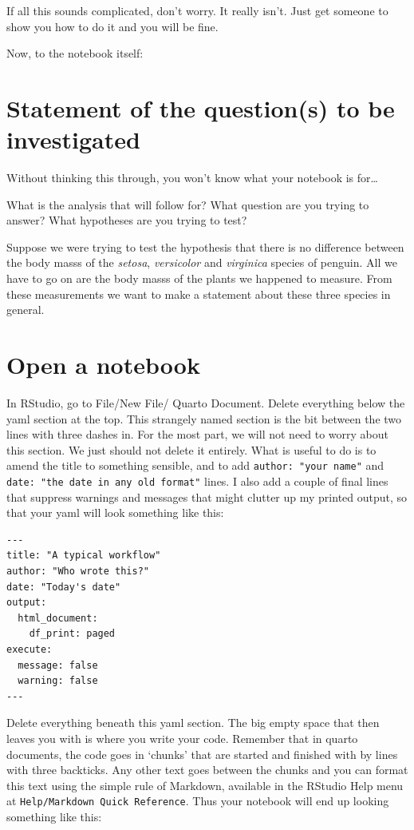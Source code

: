 \documentclass[
  letterpaper,
  DIV=11,
  numbers=noendperiod]{scrreprt}
\begin{document}
If all this sounds complicated, don't worry. It really isn't. Just get
someone to show you how to do it and you will be fine.

Now, to the notebook itself:

\section{Statement of the question(s) to be
investigated}\label{statement-of-the-questions-to-be-investigated}

Without thinking this through, you won't know what your notebook is
for\ldots{}

What is the analysis that will follow for? What question are you trying
to answer? What hypotheses are you trying to test?

Suppose we were trying to test the hypothesis that there is no
difference between the body masss of the \emph{setosa},
\emph{versicolor} and \emph{virginica} species of penguin. All we have
to go on are the body masss of the plants we happened to measure. From
these measurements we want to make a statement about these three species
in general.

\section{Open a notebook}\label{open-a-notebook}

In RStudio, go to File/New File/ Quarto Document. Delete everything
below the yaml section at the top. This strangely named section is the
bit between the two lines with three dashes in. For the most part, we
will not need to worry about this section. We just should not delete it
entirely. What is useful to do is to amend the title to something
sensible, and to add \texttt{author:\ "your\ name"} and
\texttt{date:\ "the\ date\ in\ any\ old\ format"} lines. I also add a
couple of final lines that suppress warnings and messages that might
clutter up my printed output, so that your yaml will look something like
this:

\begin{verbatim}
---
title: "A typical workflow"
author: "Who wrote this?"
date: "Today's date"
output:
  html_document:
    df_print: paged
execute:
  message: false
  warning: false
---
\end{verbatim}

Delete everything beneath this yaml section. The big empty space that
then leaves you with is where you write your code. Remember that in
quarto documents, the code goes in `chunks' that are started and
finished with by lines with three backticks. Any other text goes between
the chunks and you can format this text using the simple rule of
Markdown, available in the RStudio Help menu at
\texttt{Help/Markdown\ Quick\ Reference}. Thus your notebook will end up
looking something like this:
\end{document}
